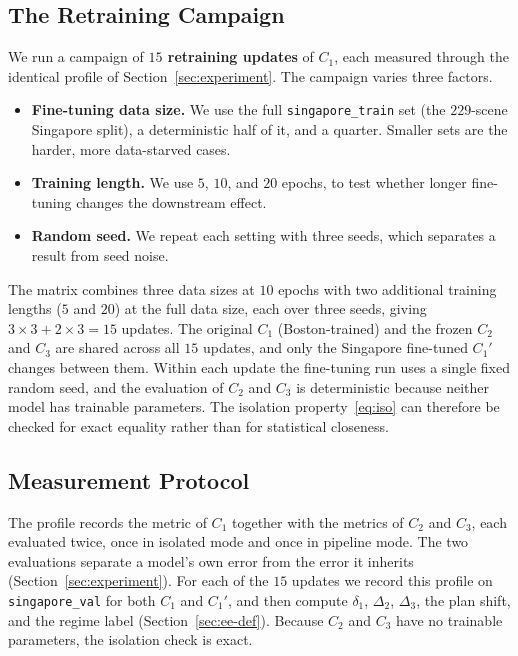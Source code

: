 \documentclass[conference]{IEEEtran}
\begin{document}
\subsection{The Retraining Campaign}
\label{sec:campaign}
We run a campaign of \textbf{$15$ retraining updates} of $C_1$, each measured
through the identical profile of Section~\ref{sec:experiment}. The campaign varies three factors.
\begin{itemize}
\item \textbf{Fine-tuning data size.} We use the full \texttt{singapore\_train}
set (the $229$-scene Singapore split), a deterministic half of it, and a quarter.
Smaller sets are the harder, more data-starved cases.
\item \textbf{Training length.} We use $5$, $10$, and $20$ epochs, to test whether
longer fine-tuning changes the downstream effect.
\item \textbf{Random seed.} We repeat each setting with three seeds, which
separates a result from seed noise.
\end{itemize}
The matrix combines three data sizes at $10$ epochs with two additional training
lengths ($5$ and $20$) at the full data size, each over three seeds, giving
$3\times3 + 2\times3 = 15$ updates. The original $C_1$ (Boston-trained) and the
frozen $C_2$ and $C_3$ are shared across all $15$ updates, and only the Singapore
fine-tuned $C_1'$ changes between them. Within each update the fine-tuning run uses a
single fixed random seed, and the evaluation of $C_2$ and $C_3$ is deterministic
because neither model has trainable parameters. The isolation
property~\eqref{eq:iso} can therefore be checked for exact equality rather than
for statistical closeness.

\subsection{Measurement Protocol}
The profile records the metric of $C_1$ together with the metrics of $C_2$ and
$C_3$, each evaluated twice, once in isolated mode and once in pipeline mode. The
two evaluations separate a model's own error from the error it inherits
(Section~\ref{sec:experiment}). For each of the $15$ updates we record this profile
on \texttt{singapore\_val} for both $C_1$ and $C_1'$, and then compute $\delta_1$, $\Delta_2$, $\Delta_3$, the
plan shift, and the regime label (Section~\ref{sec:ee-def}). Because $C_2$ and
$C_3$ have no trainable parameters, the isolation check is exact.

\end{document}
